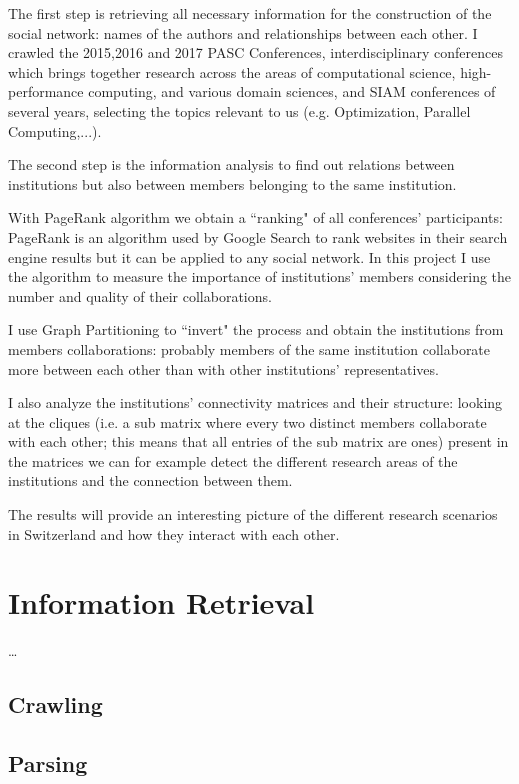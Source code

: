 \documentclass[12 pt]{article}
\begin{document}
The first step is retrieving all necessary information for the construction of the social network: names of the authors and relationships between each other. I crawled the 2015,2016 and 2017 PASC Conferences, interdisciplinary conferences which brings together research across the areas of computational science, high-performance computing, and various domain sciences, and SIAM conferences of several years, selecting the topics relevant to us (e.g. Optimization, Parallel Computing,...).

The second step is the information analysis to find out relations between institutions but also between members belonging to the same institution.

With PageRank algorithm we obtain a ``ranking" of all conferences' participants: PageRank is an algorithm used by Google Search to rank websites in their search engine results but it can be applied to any social network. In this project I use the algorithm to measure the importance of institutions' members considering the number and quality of their collaborations.

I use Graph Partitioning to ``invert" the process and obtain the institutions from members collaborations: probably members of the same institution collaborate more between each other than with other institutions' representatives.

I also analyze the institutions' connectivity matrices and their structure: looking at the cliques (i.e. a sub matrix where every two distinct members collaborate with each other; this means that all entries of the sub matrix are ones) present in the matrices we can for example detect the different research areas of the institutions and the connection between them.

The results will provide an interesting picture of the different research scenarios in Switzerland and how they interact with each other.

\section{Information Retrieval}

\ldots

\subsection{Crawling}

\subsection{Parsing}
\end{document}
